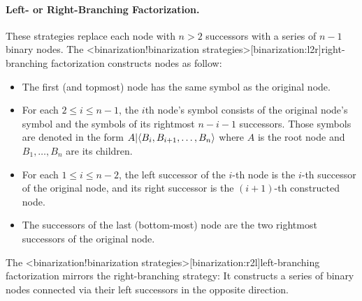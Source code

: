 \documentclass[../../document.tex]{subfiles}
\begin{document}
    \paragraph{Left- or Right-Branching Factorization.}
    These strategies replace each node with \( n>2 \) successors with a series of \( n-1 \) binary nodes.
    The <binarization!binarization strategies>[binarization:l2r]{right-branching factorization} constructs nodes as follow:
    \begin{itemize}
        \item The first (and topmost) node has the same symbol as the original node.
        \item For each \(2 \leq i \leq n-1\), the \(i\)th node's symbol consists of the original node's symbol and the symbols of its rightmost \(n-i-1\) successors. Those symbols are denoted in the form \({A}|\!\left<{B_i,B_{i+1},\ldots,B_n}\right>\) where \(A\) is the root node and \(B_1, \ldots, B_n\) are its children.
        \item For each \(1 \leq i \leq n-2\), the left successor of the \(i\)-th node is the \(i\)-th successor of the original node, and its right successor is the \((i+1)\)-th constructed node.
        \item The successors of the last (bottom-most) node are the two rightmost successors of the original node.
    \end{itemize}
    The <binarization!binarization strategies>[binarization:r2l]{left-branching factorization} mirrors the right-branching strategy: It constructs a series of binary nodes connected via their left successors in the opposite direction.
\end{document}
